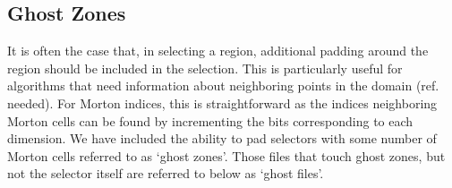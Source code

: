 \documentclass[apjl]{emulateapj}
\newcommand{\addref}{{\color{red}(ref. needed)}}
\begin{document}

\subsection{Ghost Zones}
It is often the case that, in selecting a region, additional padding around the region should be included in the selection. This is particularly useful for algorithms that need information about neighboring points in the domain \addref. For Morton indices, this is straightforward as the indices neighboring Morton cells can be found by incrementing the bits corresponding to each dimension. We have included the ability to pad selectors with some number of Morton cells referred to as `ghost zones'. Those files that touch ghost zones, but not the selector itself are referred to below as `ghost files'. 
\end{document}
